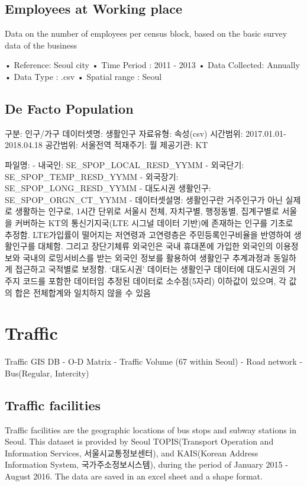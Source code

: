 \documentclass[]{book}
\theoremstyle{definition}
\theoremstyle{definition}
\theoremstyle{definition}
\theoremstyle{remark}
\begin{document}
\section{Employees at Working place}\label{employees-at-working-place}

Data on the number of employees per census block, based on the basic
survey data of the business

• Reference: Seoul city • Time Period : 2011 - 2013 • Data Collected:
Annually • Data Type : .csv • Spatial range : Seoul

\section{De Facto Population}\label{de-facto-population}

구분: 인구/가구 데이터셋명: 생활인구 자료유형: 속성(csv) 시간범위:
2017.01.01-2018.04.18 공간범위: 서울전역 적재주기: 월 제공기관: KT

파일명: - 내국인: SE\_SPOP\_LOCAL\_RESD\_YYMM - 외국단기:
SE\_SPOP\_TEMP\_RESD\_YYMM - 외국장기: SE\_SPOP\_LONG\_RESD\_YYMM -
대도시권 생활인구: SE\_SPOP\_ORGN\_CT\_YYMM - 데이터셋설명: 생활인구란
거주인구가 아닌 실제로 생활하는 인구로, 1시간 단위로 서울시 전체,
자치구별, 행정동별, 집계구별로 서울을 커버하는 KT의 통신기지국(LTE
시그널 데이터 기반)에 존재하는 인구를 기초로 추정함. LTE가입률이
떨어지는 저연령과 고연령층은 주민등록인구비율을 반영하여 생활인구를
대체함. 그리고 장단기체류 외국인은 국내 휴대폰에 가입한 외국인의
이용정보와 국내의 로밍서비스를 받는 외국인 정보를 활용하여 생활인구
추계과정과 동일하게 접근하고 국적별로 보정함. `대도시권' 데이터는
생활인구 데이터에 대도시권의 거주지 코드를 포함한 데이터임 추정된
데이터로 소수점(5자리) 이하값이 있으며, 각 값의 합은 전체합계와 일치하지
않을 수 있음

\chapter{Traffic}\label{traffic}

Traffic GIS DB - O-D Matrix - Traffic Volume (67 within Seoul) - Road
network - Bus(Regular, Intercity)

\section{Traffic facilities}\label{traffic-facilities}

Traffic facilities are the geographic locations of bus stops and subway
stations in Seoul. This dataset is provided by Seoul TOPIS(Transport
Operation and Information Services, 서울시교통정보센터), and KAIS(Korean
Address Information System, 국가주소정보시스템), during the period of
January 2015 - August 2016. The data are saved in an excel sheet and a
shape format.
\end{document}
